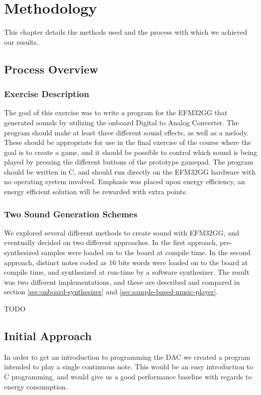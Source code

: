 \chapter{Methodology}
This chapter details the methods used and the process with which we achieved our results.

\section{Process Overview} %

\subsection{Exercise Description}
The goal of this exercise was to write a program for the EFM32GG that generated sounds by utilizing the onboard Digital to Analog Converter. The program should make at least three different sound effects, as well as a melody. These should be appropriate for use in the final exercise of the course where the goal is to create a game, and it should be possible to control which sound is being played by pressing the different buttons of the prototype gamepad. The program should be written in C, and should run directly on the EFM32GG hardware with no operating system involved. Emphasis was placed upon energy efficiency, an energy efficient solution will be rewarded with extra points.

\subsection{Two Sound Generation Schemes}
We explored several different methods to create sound with EFM32GG, and eventually decided on two different approaches. In the first approach, pre-synthesized samples were loaded on to the board at compile time. In the second approach, distinct notes coded as 16 bits words were loaded on to the board at compile time, and synthesized at run-time by a software synthesizer. The result was two different implementations, and these are described and compared in section \ref{sec:onboard-synthesizer} and \ref{sec:sample-based-music-player}.

TODO %


\section{Initial Approach}
In order to get an introduction to programming the DAC we created a program intended to play a single continuous note. This would be an easy introduction to C programming, and would give us a good performance baseline with regards to energy consumption.

